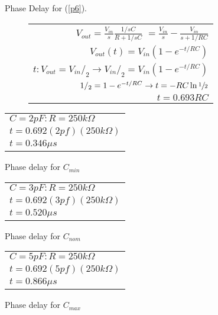 \documentclass{article}
\begin{document}
\begin{enumerate}
\begin{figure}[h]     
\centering
\caption{Phase Delay for (\ref{p6}).}
	\begin{subfigure}[b]{0.5\textwidth}%
		\centering	
		\begin{tabular}{ r }
			$V_{out} = \frac{V_{in}}{s}\frac{1/{s C}}{R + 1/{s C}}$%
			$ = \frac{V_{in}}{s} - \frac{V_{in}}{s + 1/{RC}}$\\
			$V_{out}(t) = V_{in}(1 - e^{-t/{RC}})$\\
			$t \colon V_{out} = V_{in}/_2 \rightarrow V_{in}/_2 = V_{in} (1 - e^{-t/{RC}})$\\
			$1/_2 = 1 - e^{-t/{RC}} \rightarrow t = -RC \ln \sfrac{1}{2}$\\
			$t = 0.693 R C$\\
			\hline
		\end{tabular}
	\end{subfigure}

	\begin{subtable}[b]{0.3\textwidth}
		\centering
		\begin{tabular}{ l }
			$C = 2pF \colon R = 250k\Omega$\\
			$t = 0.692 (2pf)(250k\Omega)$\\
			$t = 0.346\mu s$
		\end{tabular}
	  	\caption{Phase delay for $C_{min}$}
	\end{subtable}
	\begin{subtable}[b]{0.3\textwidth}
		\centering
		\begin{tabular}{ l }
			$C = 3pF \colon R = 250k\Omega$\\
			$t = 0.692 (3pf)(250k\Omega)$\\
			$t = 0.520\mu s$
		\end{tabular}
		\caption{Phase delay for $C_{nom}$} 
	\end{subtable}
	\begin{subtable}[b]{0.3\textwidth}
		\centering
		\begin{tabular}{ l }
			$C = 5pF \colon R = 250k\Omega$\\
			$t = 0.692 (5pf)(250k\Omega)$\\
			$t = 0.866\mu s$
		\end{tabular}
		\caption{Phase delay for $C_{max}$}
	\end{subtable}

\end{figure}

\end{enumerate}
\label{end}
\end{document}
